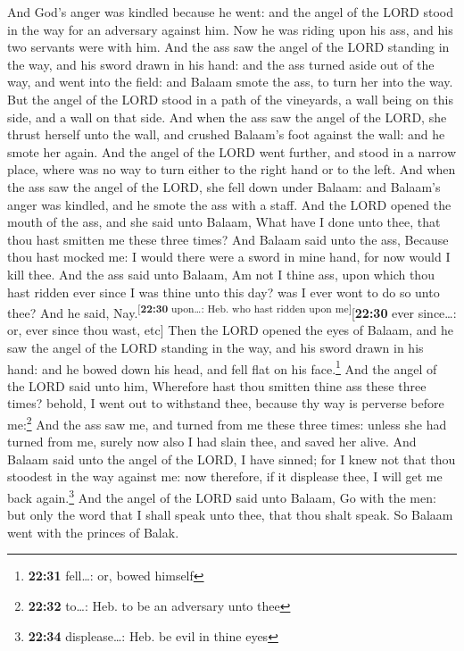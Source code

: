  And God's anger was kindled because he went: and the
angel of the LORD stood in the way for an adversary against him. Now he
was riding upon his ass, and his two servants were with him.
 And the ass saw the angel of the LORD standing in the
way, and his sword drawn in his hand: and the ass turned aside out of
the way, and went into the field: and Balaam smote the ass, to turn her
into the way.  But the angel of the LORD stood in a path
of the vineyards, a wall being on this side, and a wall on that side.
 And when the ass saw the angel of the LORD, she thrust
herself unto the wall, and crushed Balaam's foot against the wall: and
he smote her again.  And the angel of the LORD went
further, and stood in a narrow place, where was no way to turn either to
the right hand or to the left.  And when the ass saw the
angel of the LORD, she fell down under Balaam: and Balaam's anger was
kindled, and he smote the ass with a staff.  And the LORD
opened the mouth of the ass, and she said unto Balaam, What have I done
unto thee, that thou hast smitten me these three times? 
And Balaam said unto the ass, Because thou hast mocked me: I would there
were a sword in mine hand, for now would I kill thee. 
And the ass said unto Balaam, Am not I thine ass, upon which thou hast
ridden ever since I was thine unto this day? was I ever wont to do so
unto thee? And he said, Nay.\textsuperscript{{[}\textbf{22:30}
upon\ldots: Heb. who hast ridden upon me{]}}{[}\textbf{22:30} ever
since\ldots: or, ever since thou wast, etc{]}  Then the
LORD opened the eyes of Balaam, and he saw the angel of the LORD
standing in the way, and his sword drawn in his hand: and he bowed down
his head, and fell flat on his face.\footnote{\textbf{22:31} fell\ldots:
  or, bowed himself}  And the angel of the LORD said unto
him, Wherefore hast thou smitten thine ass these three times? behold, I
went out to withstand thee, because thy way is perverse before
me:\footnote{\textbf{22:32} to\ldots: Heb. to be an adversary unto thee}
 And the ass saw me, and turned from me these three
times: unless she had turned from me, surely now also I had slain thee,
and saved her alive.  And Balaam said unto the angel of
the LORD, I have sinned; for I knew not that thou stoodest in the way
against me: now therefore, if it displease thee, I will get me back
again.\footnote{\textbf{22:34} displease\ldots: Heb. be evil in thine
  eyes}  And the angel of the LORD said unto Balaam, Go
with the men: but only the word that I shall speak unto thee, that thou
shalt speak. So Balaam went with the princes of Balak.

